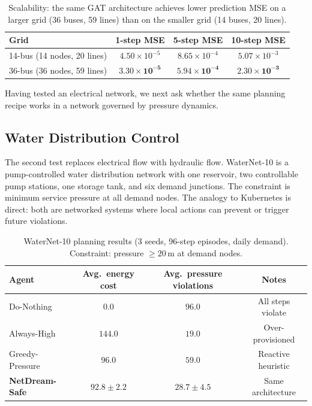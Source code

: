 \begin{table}[H]
\centering
\small
\caption{Scalability: the same GAT architecture achieves lower prediction MSE
on a larger grid (36 buses, 59 lines) than on the smaller grid (14 buses, 20 lines).}
\label{tab:scalability}
\begin{tabular}{@{}lccc@{}}
\toprule
Grid & 1-step MSE & 5-step MSE & 10-step MSE \\
\midrule
14-bus (14 nodes, 20 lines) & $4.50 \times 10^{-5}$ & $8.65 \times 10^{-4}$ & $5.07 \times 10^{-3}$ \\
36-bus (36 nodes, 59 lines) & $\mathbf{3.30 \times 10^{-5}}$ & $\mathbf{5.94 \times 10^{-4}}$ & $\mathbf{2.30 \times 10^{-3}}$ \\
\bottomrule
\end{tabular}
\end{table}

Having tested an electrical network, we next ask whether the same
planning recipe works in a network governed by pressure dynamics.

\subsection{Water Distribution Control}
\label{app:water}

The second test replaces electrical flow with hydraulic flow.  WaterNet-10
is a pump-controlled water distribution network with one reservoir, two
controllable pump stations, one storage tank, and six demand junctions.
The constraint is minimum service pressure at all demand nodes.  The
analogy to Kubernetes is direct: both are networked systems where local
actions can prevent or trigger future violations.

\begin{table}[H]
\centering
\small
\caption{WaterNet-10 planning results (3 seeds, 96-step episodes, daily demand).
Constraint: pressure $\geq 20\,\text{m}$ at demand nodes.}
\label{tab:water-planning}
\begin{tabular}{@{}lccc@{}}
\toprule
Agent & Avg.\ energy cost & Avg.\ pressure violations & Notes \\
\midrule
Do-Nothing         & $0.0$             & $96.0$             & All steps violate \\
Always-High        & $144.0$           & $19.0$             & Over-provisioned \\
Greedy-Pressure    & $96.0$            & $59.0$             & Reactive heuristic \\
\textbf{NetDream-Safe} & $\mathbf{92.8\pm2.2}$ & $\mathbf{28.7\pm4.5}$ & Same architecture \\
\bottomrule
\end{tabular}
\end{table}

